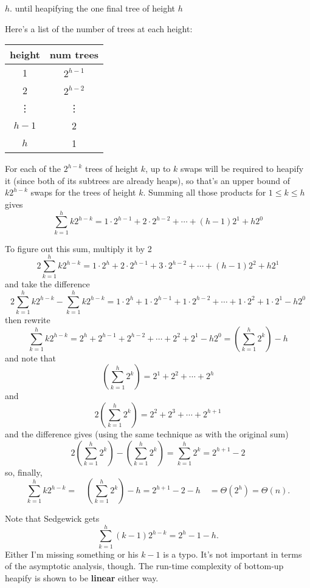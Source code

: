 \documentclass{article}
\begin{document}
\vspace{0.5pc}
$h$. until heapifying the one final tree of height $h$

\vspace{1pc}
Here's a list of the number of trees at each height:
\begin{center}
\begin{tabular}{c|c}
height  & num trees \\
\hline
 1      & $2^{h-1}$ \\
 2      & $2^{h-2}$ \\
 \vdots & \vdots    \\
 $h-1$  & 2         \\
 $h$    & 1         \\
\end{tabular}
\end{center}

For each of the $2^{h-k}$ trees of height $k$, up to $k$ swaps will be required
to heapify it (since both of its subtrees are already heaps), so that's an
upper bound of $k2^{h-k}$ swaps for the trees of height $k$. Summing all those
products for
$1\le k\le h$ gives
\[
  \sum_{k=1}^{h} k2^{h-k}
=
  1\cdot2^{h-1} + 2\cdot2^{h-2} + \cdots + (h-1)2^1 + h2^0
\]

To figure out this sum, multiply it by 2
\[
  2\sum_{k=1}^{h} k2^{h-k}
=
  1\cdot2^{h} + 2\cdot2^{h-1} + 3\cdot2^{h-2} + \cdots + (h-1)2^2 + h2^1
\]
and take the difference
\[
  2\sum_{k=1}^{h} k2^{h-k}
-
  \sum_{k=1}^{h} k2^{h-k}
=
  1\cdot2^{h} + 1\cdot2^{h-1} + 1\cdot2^{h-2} + \cdots + 1\cdot2^2 + 1\cdot2^1 - h2^0
\]
then rewrite
\[
  \sum_{k=1}^{h} k2^{h-k}
=
  2^{h} + 2^{h-1} + 2^{h-2} + \cdots + 2^2 + 2^1 - h2^0
=
  \left(\sum_{k=1}^{h} 2^{k}\right) - h
\]
and note that
\[
  \left(\sum_{k=1}^{h} 2^{k}\right)
= 
  2^1 + 2^2 + \cdots + 2^h
\]
and
\[
  2\left(\sum_{k=1}^{h} 2^{k}\right)
= 
  2^2 + 2^3 + \cdots + 2^{h+1}
\]
and the difference gives (using the same technique as with the original sum)
\[
  2\left(\sum_{k=1}^{h} 2^{k}\right)
  -\left(\sum_{k=1}^{h} 2^{k}\right)
=
  \sum_{k=1}^{h} 2^{k}
=
  2^{h+1} - 2
\]
so, finally,
\[
  \sum_{k=1}^{h} k2^{h-k}
=
\quad
  \left(\sum_{k=1}^{h} 2^{k}\right) - h
=
  2^{h+1} - 2 - h
\quad
=
  \Theta(2^h)
=
  \Theta(n).
\]

Note that Sedgewick gets
\[
  \sum_{k=1}^{h} (k-1)2^{h-k}
=
  2^{h} - 1 - h.
\]
Either I'm missing something or his $k-1$ is a typo.
It's not important in terms of the asymptotic analysis, though.
The run-time complexity of bottom-up heapify is shown to be \textbf{linear}
either way.
\end{document}
